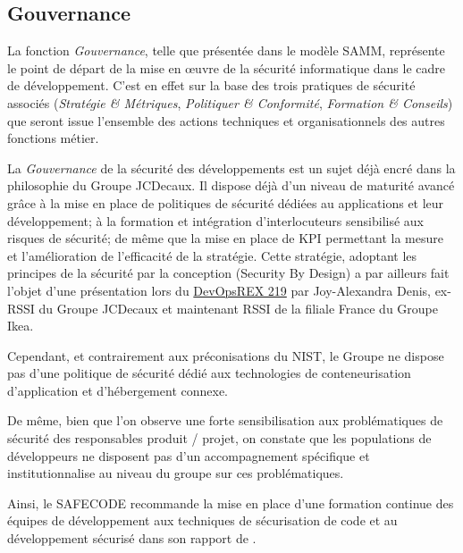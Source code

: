 \subsection{Gouvernance}

La fonction \emph{Gouvernance}, telle que présentée dans le modèle \ac{SAMM}, représente le point de départ de la 
mise en œuvre de la sécurité informatique dans le cadre de développement. C'est en effet sur la base des 
trois pratiques de sécurité associés (\emph{Stratégie \& Métriques}, \emph{Politiquer \& Conformité}, 
\emph{Formation \& Conseils}) que seront issue l'ensemble des actions techniques et organisationnels des autres
fonctions métier.

La \emph{Gouvernance} de la sécurité des développements est un sujet déjà encré dans la philosophie du Groupe JCDecaux.
Il dispose déjà d'un niveau de maturité avancé grâce à la mise en place de politiques de sécurité dédiées au 
applications et leur développement; à la formation et intégration d'interlocuteurs sensibilisé aux risques de sécurité;
de même que la mise en place de \ac{KPI} permettant la mesure et l'amélioration de l'efficacité de la stratégie.
\newline Cette stratégie, adoptant les principes de la sécurité par la conception (Security By Design) a par ailleurs 
fait  l'objet d'une présentation\autocite{devopsrex_denis_2019} lors du \href{https://2019.devopsrex.fr/}{DevOpsREX 219} 
par Joy-Alexandra Denis, ex-RSSI du Groupe JCDecaux et maintenant RSSI de la filiale France du Groupe Ikea.

Cependant, et contrairement aux préconisations du \ac{NIST}\autocite*{app_cont_sec_nist_2017}, le Groupe ne dispose pas
d'une politique de sécurité dédié aux technologies de conteneurisation d'application et d'hébergement connexe. 

De même, bien que l'on observe une forte sensibilisation aux problématiques de sécurité des responsables produit / 
projet, on constate que les populations de développeurs ne disposent pas d'un accompagnement spécifique et
institutionnalise au niveau du groupe sur ces \linebreak problématiques.

Ainsi, le \ac{SAFECODE} recommande la mise en place d'une formation continue des équipes de développement aux techniques
de sécurisation de code et au développement sécurisé dans son rapport  de 
.

\newpage

